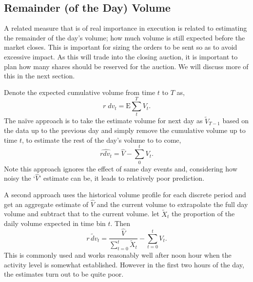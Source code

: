 \subsection{Remainder (of the Day) Volume}

A related measure that is of real importance in execution is related to estimating the remainder of the day's volume; how much volume is still expected before the market closes. This is important for sizing the orders to be sent so as to avoid excessive impact. As this will trade into the closing auction, it is important to plan how many shares should be reserved for the auction. We will discuss more of this in the next section.


Denote the expected cumulative volume from time $t$ to $T$ as,
	\begin{equation} \label{eq:rdv_1}
	r \;dv_t = \text{E} \sum_t^T V_t.
	\end{equation}
The na\"ive approach is to take the estimate volume for next day as $\tilde{V}_{T-1}$  based on the data up to the previous day and simply remove the cumulative volume up to time $t$, to estimate the rest of the day's volume to to come,
	\begin{equation}\label{eq:rdv_2}
	\widehat{rdv_t}=  \hat{V} - \sum_0^t V_t.
	\end{equation}
Note this approach ignores the effect of same day events and, considering how noisy the `$\hat{V}$' estimate can be, it leads to relatively poor prediction.


A second approach uses the historical volume profile for each discrete period and get an aggregate estimate of $\hat{V}$ and the current volume to extrapolate the full day volume and subtract that to the current volume. let $\tilde{X}_t$ the proportion of the daily volume expected in time bin $t$. Then
	\begin{equation} \label{eq:rdv_3}
	\widetilde{r\,dv_t}= \dfrac{\hat{V}}{\sum_{t=0}^t \tilde{X}_t} - \sum_{t=0}^t V_t.
	\end{equation}
This is commonly used and works reasonably well after noon hour when the activity level is somewhat established. However in the first two hours of the day, the estimates turn out to be quite poor.


